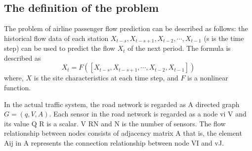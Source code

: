 \documentclass[journal,article,submit,moreauthors,pdftex]{Definitions/mdpi}
\begin{document}
\subsection{The definition of the problem } 
The problem of airline passenger flow prediction can be described as follows: the historical flow data of each station $X_{t-s}, X_{t-s+1},  X_{t-2}, \cdots,  X_{t-1}$ (s is the time step) can be used to predict the flow $X_{t}$ of the next period. 
The formula is described as
\begin{equation}
    X_{t} = F([ X_{t-s}, X_{t-s+1}, \cdots, X_{t-2}, X_{t-1}])
\end{equation}
where, $X$ is the site characteristics at each time step, and $F$ is a nonlinear function.
\par In the actual traffic system, the road network is regarded as A directed graph $G = (q, V, A)$. Each sensor in the road network is regarded as a node vi V and its value Q R is a scalar. V RN and N is the number of sensors. 
The flow relationship between nodes consists of adjacency matrix A that is, the element Aij in A represents the connection relationship between node VI and vJ.
\end{document}
